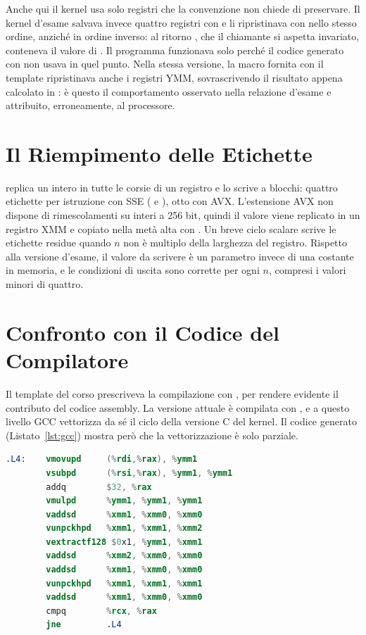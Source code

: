 Anche qui il kernel usa solo registri che la convenzione non chiede di preservare. Il kernel d'esame salvava invece quattro registri con  e li ripristinava con  nello stesso ordine, anziché in ordine inverso: al ritorno , che il chiamante si aspetta invariato, conteneva il valore di . Il programma funzionava solo perché il codice generato con  non usava  in quel punto. Nella stessa versione, la macro  fornita con il template ripristinava anche i registri YMM, sovrascrivendo il risultato appena calcolato in : è questo il comportamento osservato nella relazione d'esame e attribuito, erroneamente, al processore.

\section{Il Riempimento delle Etichette}

 replica un intero in tutte le corsie di un registro e lo scrive a blocchi: quattro etichette per istruzione con SSE ( e ), otto con AVX. L'estensione AVX non dispone di rimescolamenti su interi a 256 bit, quindi il valore viene replicato in un registro XMM e copiato nella metà alta con . Un breve ciclo scalare scrive le etichette residue quando $n$ non è multiplo della larghezza del registro. Rispetto alla versione d'esame, il valore da scrivere è un parametro invece di una costante in memoria, e le condizioni di uscita sono corrette per ogni $n$, compresi i valori minori di quattro.

\section{Confronto con il Codice del Compilatore}
\label{sec:compilatore}

Il template del corso prescriveva la compilazione con , per rendere evidente il contributo del codice assembly. La versione attuale è compilata con , e a questo livello GCC vettorizza da sé il ciclo della versione C del kernel. Il codice generato (Listato~\ref{lst:gcc}) mostra però che la vettorizzazione è solo parziale.

\begin{lstlisting}[language=nasm, caption={Ciclo di \codice{dist2\_c} generato da GCC 16 con \codice{-O2 -mavx} (sintassi AT\&T).}, label={lst:gcc}]
.L4:    vmovupd     (%rdi,%rax), %ymm1
        vsubpd      (%rsi,%rax), %ymm1, %ymm1
        addq        $32, %rax
        vmulpd      %ymm1, %ymm1, %ymm1
        vaddsd      %xmm1, %xmm0, %xmm0
        vunpckhpd   %xmm1, %xmm1, %xmm2
        vextractf128 $0x1, %ymm1, %xmm1
        vaddsd      %xmm2, %xmm0, %xmm0
        vaddsd      %xmm1, %xmm0, %xmm0
        vunpckhpd   %xmm1, %xmm1, %xmm1
        vaddsd      %xmm1, %xmm0, %xmm0
        cmpq        %rcx, %rax
        jne         .L4
\end{lstlisting}

